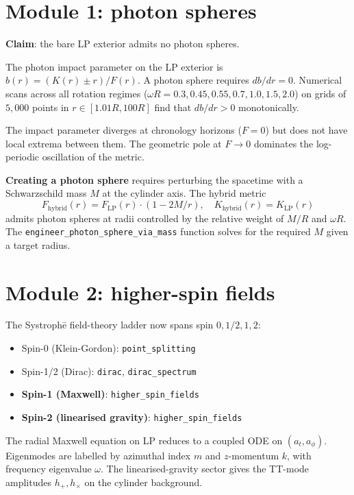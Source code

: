 \documentclass[11pt,a4paper]{article}
\begin{document}
\section{Module 1: photon spheres}

\textbf{Claim}: the bare LP exterior admits no photon spheres.

The photon impact parameter on the LP exterior is
$b(r) = (K(r) \pm r) / F(r)$. A photon sphere requires
$db / dr = 0$. Numerical scans across all rotation regimes
($\omega R = 0.3, 0.45, 0.55, 0.7, 1.0, 1.5, 2.0$) on grids of
$5{,}000$ points in $r \in [1.01 R, 100 R]$ find that $db/dr > 0$
monotonically.

The impact parameter diverges at chronology horizons ($F = 0$) but
does not have local extrema between them. The geometric pole at
$F \to 0$ dominates the log-periodic oscillation of the metric.

\textbf{Creating a photon sphere} requires perturbing the spacetime
with a Schwarzschild mass $M$ at the cylinder axis. The hybrid
metric
\[
F_\text{hybrid}(r) = F_\text{LP}(r) \cdot (1 - 2 M / r),\quad
K_\text{hybrid}(r) = K_\text{LP}(r)
\]
admits photon spheres at radii controlled by the relative weight of
$M / R$ and $\omega R$. The
\texttt{engineer\_photon\_sphere\_via\_mass} function solves for the
required $M$ given a target radius.

\section{Module 2: higher-spin fields}

The Systroph\=e field-theory ladder now spans spin $0, 1/2, 1, 2$:
\begin{itemize}
\item Spin-0 (Klein-Gordon): \texttt{point\_splitting}
\item Spin-1/2 (Dirac): \texttt{dirac}, \texttt{dirac\_spectrum}
\item \textbf{Spin-1 (Maxwell)}: \texttt{higher\_spin\_fields}
\item \textbf{Spin-2 (linearised gravity)}: \texttt{higher\_spin\_fields}
\end{itemize}

The radial Maxwell equation on LP reduces to a coupled ODE on
$(a_t, a_\phi)$. Eigenmodes are labelled by azimuthal index $m$
and $z$-momentum $k$, with frequency eigenvalue $\omega$. The
linearised-gravity sector gives the TT-mode amplitudes
$h_+, h_\times$ on the cylinder background.
\end{document}
